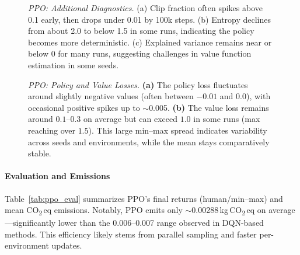 \begin{figure} 
	\centering
	\caption{\emph{PPO: Additional Diagnostics.}
		(a) Clip fraction often spikes above 0.1 early, then drops under 0.01 by 100k steps.
		(b) Entropy declines from about 2.0 to below 1.5 in some runs, 
		indicating the policy becomes more deterministic.
		(c) Explained variance remains near or below 0 for many runs, 
		suggesting challenges in value function estimation in some seeds.}
	\label{fig:ppo_additional_losses}
\end{figure}

\begin{figure} 
	\centering
	\quad
	\caption{\emph{PPO: Policy and Value Losses.}
		\textbf{(a)} The policy loss fluctuates around slightly negative values 
		(often between $-0.01$ and $0.0$), with occasional positive spikes up to $\sim$\num{0.005}. 
		\textbf{(b)} The value loss remains around $0.1$--$0.3$ on average but can exceed $1.0$ in some runs 
		(max reaching over $1.5$). This large min--max spread indicates variability across seeds and environments, 
		while the mean stays comparatively stable.}
	\label{fig:ppo_pol_val_losses}
\end{figure}

\paragraph{Evaluation and Emissions}
Table~\ref{tab:ppo_eval} summarizes PPO's final returns (human/min--max) and mean CO\textsubscript{2}\,eq emissions. 
Notably, PPO emits only $\sim$\num{0.00288}\,kg\,CO\textsubscript{2}\,eq on average—significantly lower than the 0.006--0.007 range observed in DQN-based methods. This efficiency likely stems from parallel sampling and faster per-environment updates.

